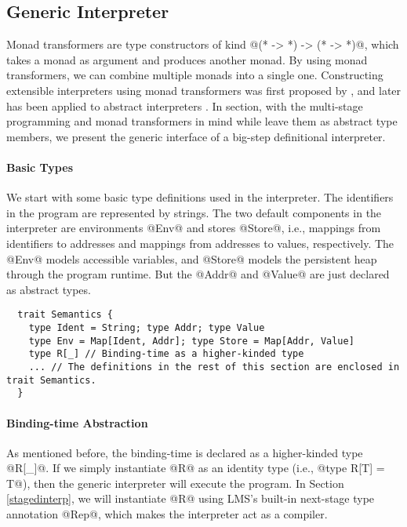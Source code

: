\subsection{Generic Interpreter} \label{generic_if}

Monad transformers are type constructors of kind @(* -> *) -> (* -> *)@, which
takes a monad as argument and produces another monad. By using monad
transformers, we can combine multiple monads into a single one. Constructing
extensible interpreters using monad transformers was first proposed by
\citet{DBLP:conf/popl/LiangHJ95}, and later has been applied to abstract
interpreters \cite{Sergey:2013:MAI:2491956.2491979,
DBLP:journals/pacmpl/DaraisLNH17, Darais:2015:GTM:2814270.2814308}. In section,
with the multi-stage programming and monad transformers in mind while leave them
as abstract type members, we present the generic interface of a big-step
definitional interpreter.

\paragraph{Basic Types} We start with some basic type definitions used in the
interpreter. The identifiers in the program are represented by strings. The two
default components in the interpreter are environments @Env@ and stores @Store@,
i.e., mappings from identifiers to addresses and mappings from addresses to
values, respectively. The @Env@ models accessible variables, and @Store@ models
the persistent heap through the program runtime. But the @Addr@ and @Value@ are
just declared as abstract types.

\begin{lstlisting}
  trait Semantics {
    type Ident = String; type Addr; type Value
    type Env = Map[Ident, Addr]; type Store = Map[Addr, Value]
    type R[_] // Binding-time as a higher-kinded type
    ... // The definitions in the rest of this section are enclosed in trait Semantics.
  }
\end{lstlisting}

\paragraph{Binding-time Abstraction} As mentioned before, the binding-time is
declared as a higher-kinded type @R[_]@. If we simply instantiate @R@ as an identity
type (i.e., @type R[T] = T@), then the generic interpreter will execute the program.
In Section \ref{stagedinterp}, we will instantiate @R@ using LMS's built-in
next-stage type annotation @Rep@, which makes the interpreter act as a compiler.

